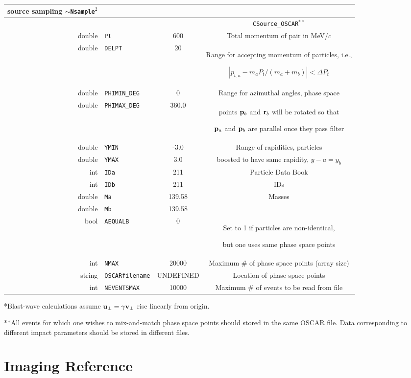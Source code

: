 \documentclass[10pt]{article}
\begin{document}
\begin{center}
\begin{tabular}{|r|l|c|c|}
{\centerline{source sampling $\sim${\tt Nsample}$^2$}}\\ \hline\hline
& & & {\tt CSource\_OSCAR$^{**}$} \\ \hline
double & {\tt Pt} & 600 & Total momentum of pair in MeV/$c$ \\ \hline
double & {\tt DELPT} & 20 & \parbox{3.8in}
{\centerline{Range for accepting momentum of particles, i.e.,}
\centerline{$|p_{t,a}-m_aP_t/(m_a+m_b)|<\Delta P_t$}}\\ \hline
double & {\tt PHIMIN\_DEG} & 0 & Range for azimuthal angles, phase space\\
double & {\tt PHIMAX\_DEG} & 360.0 & \parbox{3.8in}{\centerline{points ${\bf p}_b$ and ${\bf r}_b$ will be rotated so that}
\centerline{${\bf p}_a$ and ${\bf p}_b$ are parallel once they pass filter}}\\ \hline
double & {\tt YMIN} & -3.0 & Range of rapidities, particles\\
double & {\tt YMAX} & 3.0 & boosted to have same rapidity, $y-a=y_b$\\ \hline
int & {\tt IDa} & 211 & Particle Data Book \\
int & {\tt IDb} & 211 & IDs\\ \hline
double & {\tt Ma} & 139.58 & Masses \\
double & {\tt Mb} & 139.58 & \\ \hline
bool & {\tt AEQUALB} & 0 & \parbox{3.8in}{\centerline{Set to 1 if particles are non-identical,}
\centerline{but one uses same phase space points}}\\ \hline
int & {\tt NMAX} & 20000 & Maximum \# of phase space points (array size)\\ \hline
string & {\tt OSCARfilename} & UNDEFINED & Location of phase space points\\ \hline
int & {\tt NEVENTSMAX} & 10000 & Maximum \# of events to be read from file\\ \hline
\end{tabular}
\end{center}
*Blast-wave calculations assume ${\bf u}_\perp=\gamma{\bf v}_\perp$ rise linearly from origin.

**All events for which one wishes to mix-and-match phase space points should stored in the same OSCAR file. Data corresponding to different impact parameters should be stored in different files.
\newpage

\section{Imaging Reference}
\end{document}
